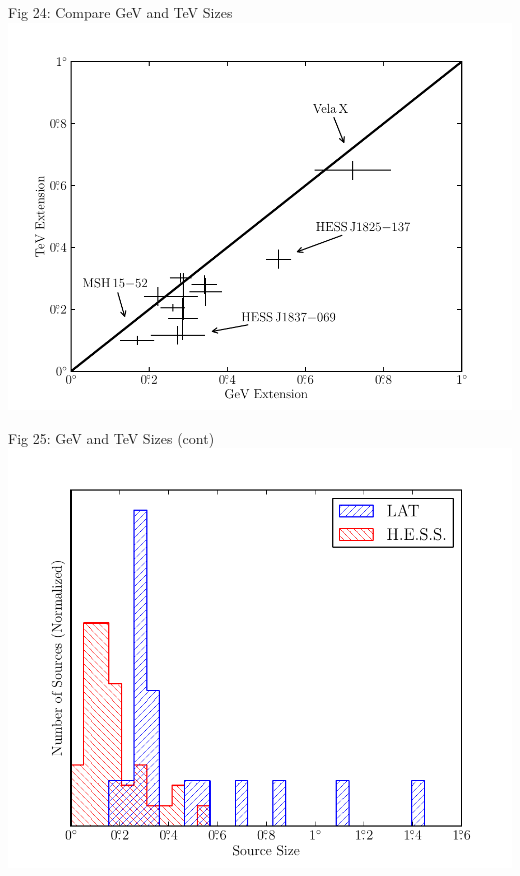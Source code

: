 \documentclass[12pt]{beamer}
\begin{document}
\begin{frame}{Fig 24: Compare GeV and TeV Sizes}
  \includegraphics[scale=0.60]{plots/gev_vs_tev_plot_color.pdf}
\end{frame}

\begin{frame}{Fig 25: GeV and TeV Sizes (cont)}
  \includegraphics[scale=0.60]{plots/gev_vs_tev_histogram_color.pdf}
\end{frame}
\end{document}
